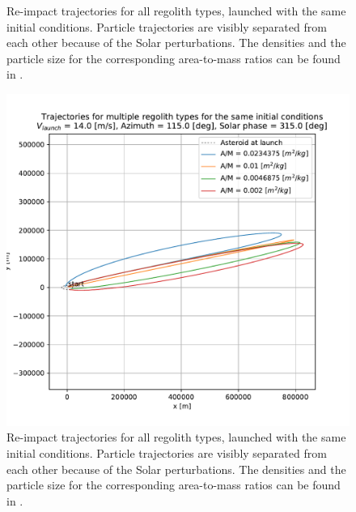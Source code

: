 \documentclass[print]{tudelft-report}
\begin{document}
\begin{appendices}
\begin{figure}[htb]
    \caption{Re-impact trajectories for all regolith types, launched with the same initial conditions. Particle trajectories are visibly separated from each other because of the Solar perturbations. The densities and the particle size for the corresponding area-to-mass ratios can be found in .}
    \label{fig:crash_traj_14ms_115Azim_225solarPhase_leadingEdge}
    \end{figure}
    \FloatBarrier
    \begin{figure}[htb]
    \centering
    \captionsetup{justification=centering}
    \includegraphics[width=\textwidth, height=0.4\textheight, keepaspectratio=true]{Results/Images/leading_edge_perturbations/reimpact_traj_14ms_115Azim_315solarPhase.pdf}
    \caption{Re-impact trajectories for all regolith types, launched with the same initial conditions. Particle trajectories are visibly separated from each other because of the Solar perturbations. The densities and the particle size for the corresponding area-to-mass ratios can be found in .}
    \label{fig:crash_traj_14ms_115Azim_315solarPhase_leadingEdge}
    \end{figure}
    \FloatBarrier
    \begin{figure}[htb]
    \centering
    \captionsetup{justification=centering}

\end{figure}
\end{appendices}
\end{document}
